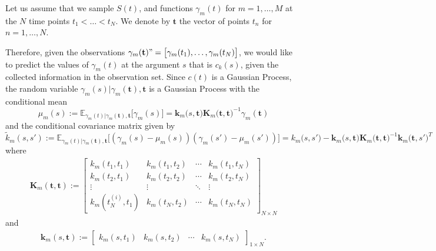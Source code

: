 Let us assume that we sample $S(t)$, and functions $\gamma_m(t)$ for $m = 1,\ldots, M$ at the $N$ time points $t_1 < \ldots <t_N$. We denote by $\mathbf{t}$ the vector of points $t_n$ for $n = 1,\ldots, N$.  

Therefore, given the observations $\gamma_m(\mathbf{t}) "= \big[ \gamma_m(t_1), \ldots, \gamma_m(t_N) \big]$, we would like to predict the values of $\gamma_m(t)$ at the argument $s$ that is $c_k(s)$, given the collected information in the observation set. Since $c(t)$ is a Gaussian Process, the random variable $\gamma_m(s)| \gamma_m(\mathbf{t}), \mathbf{t}$ is a Gaussian Process with the conditional mean
\begin{equation*}
\mu_m(s):=\mathbb{E}_{\gamma_m(t)|\gamma_m(\mathbf{t}), \mathbf{t}} \big[\gamma_m(s) \big] =  \mathbf{k}_m \big(s,\mathbf{t}\big) \mathbf{K}_m \big(\mathbf{t},\mathbf{t}\big)^{-1} \gamma_m(\mathbf{t})
\end{equation*}
and the conditional covariance matrix given by
\begin{equation*}
\tilde{k}_m(s,s'):= \mathbb{E}_{\gamma_m(t)|\gamma_m(\mathbf{t}), \mathbf{t}} \bigg[(\gamma_m(s) - \mu_m(s))(\gamma_m(s') - \mu_m(s'))\bigg] = k_m \big(s,s'\big) - \mathbf{k}_m\big(s,\mathbf{t}\big) \mathbf{K}_m \big(\mathbf{t},\mathbf{t}\big)^{-1} \mathbf{k}_m \big(\mathbf{t},s'\big) ^T
\end{equation*}
where
\begin{align*}
\mathbf{K}_m (\mathbf{t},\mathbf{t}) := \begin{bmatrix}
k_m(t_1,t_1) & k_m(t_1,t_2)& \cdots & k_m(t_1,t_{N}) \\
k_m(t_2,t_1) & k_m(t_2,t_2)& \cdots & k_m(t_2,t_{N}) \\
\vdots & \vdots & \ddots & \vdots  \\
k_m(t_{N}^{(i)},t_1) & k_m(t_{N},t_2)& \cdots & k_m(t_{N},t_{N}) 
\end{bmatrix}_{ N \times N}
\end{align*}
and
\begin{align*}
\mathbf{k}_m (s,\mathbf{t}) := \begin{bmatrix}
k_m(s,t_1) & k_m(s,t_2)& \cdots & k_m(s,t_{N})
\end{bmatrix}_{ 1 \times N}. 
\end{align*}

